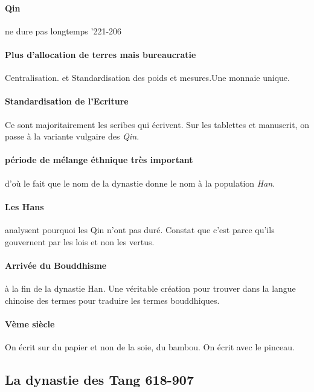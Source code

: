 \paragraph{Qin} ne dure pas longtemps '221-206
\paragraph{Plus d'allocation de terres mais bureaucratie} Centralisation. et Standardisation des poids et mesures.Une monnaie unique. 

\paragraph{Standardisation de l'Ecriture} Ce sont majoritairement les scribes qui écrivent. Sur les tablettes et manuscrit, on passe à la variante vulgaire des \textit{Qin. } 

\paragraph{période de mélange éthnique très important} d'où le fait que le nom de la dynastie donne le nom à la population \textit{Han}. 

\paragraph{Les Hans} analysent pourquoi les Qin n'ont pas duré. Constat que c'est parce qu'ils gouvernent par les lois et non les vertus.

\paragraph{Arrivée du Bouddhisme} à la fin de la dynastie Han. 
Une véritable création pour trouver dans la langue chinoise des termes pour traduire les termes bouddhiques. 

\paragraph{Vème siècle} On écrit sur du papier et non de la soie, du bambou. On écrit avec le pinceau. 

\subsection{La dynastie des Tang 618-907}

